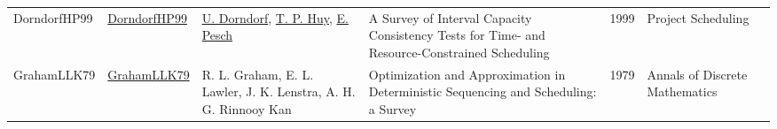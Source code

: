 {\begin{longtable}{p{2cm}p{2cm}p{5cm}p{10cm}rp{3cm}l}
DorndorfHP99 & \href{http://dx.doi.org/10.1007/978-1-4615-5533-9_10}{DorndorfHP99} & \hyperref[auth:a904]{U. Dorndorf}, \hyperref[auth:a905]{T. P. Huy}, \hyperref[auth:a438]{E. Pesch} & A Survey of Interval Capacity Consistency Tests for Time- and Resource-Constrained Scheduling & 1999 & Project Scheduling & \cite{DorndorfHP99}\\
GrahamLLK79 & \href{http://dx.doi.org/10.1016/s0167-5060(08)70356-x}{GrahamLLK79} & R. L. Graham, E. L. Lawler, J. K. Lenstra, A. H. G. Rinnooy Kan & \cellcolor{green!10}Optimization and Approximation in Deterministic Sequencing and Scheduling: a Survey & 1979 & Annals of Discrete Mathematics & \cite{GrahamLLK79}\\
\end{longtable}
}

